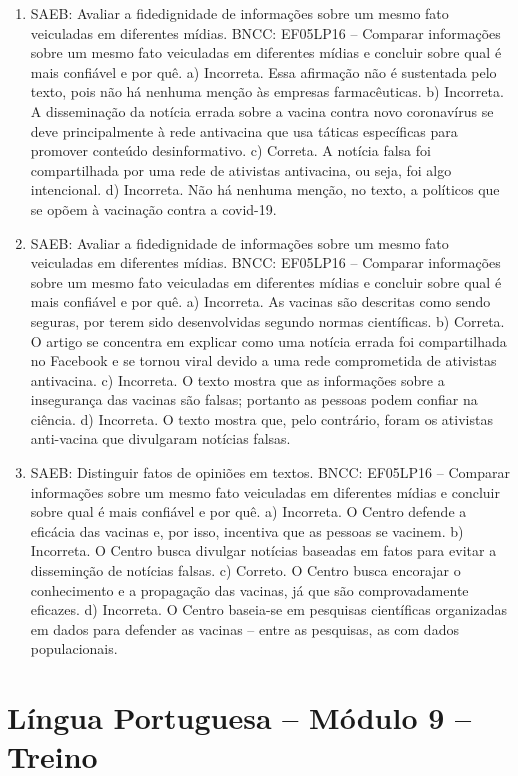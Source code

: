 \begin{enumerate}
\item
SAEB: Avaliar a fidedignidade de informações sobre um mesmo fato veiculadas em diferentes mídias. BNCC:
EF05LP16 – Comparar informações sobre um mesmo fato veiculadas em diferentes mídias e concluir sobre qual é mais confiável e por quê.
a) Incorreta. Essa afirmação não é sustentada pelo texto, pois não há
nenhuma menção às empresas farmacêuticas.
b) Incorreta. A disseminação da notícia errada sobre a vacina contra novo coronavírus se deve principalmente à rede antivacina que usa táticas
específicas para promover conteúdo desinformativo.
c) Correta. A notícia falsa foi compartilhada por uma rede de ativistas
antivacina, ou seja, foi algo intencional.
d) Incorreta. Não há nenhuma menção, no texto, a políticos que se opõem à vacinação
contra a covid-19.

\item
SAEB: Avaliar a fidedignidade de informações sobre um mesmo fato veiculadas em diferentes mídias. BNCC:
EF05LP16 – Comparar informações sobre um mesmo fato veiculadas em diferentes mídias e concluir sobre qual é mais confiável e por quê.
a) Incorreta. As vacinas são descritas como sendo seguras, por terem
sido desenvolvidas segundo normas científicas.
b) Correta. O artigo se concentra em explicar como uma notícia errada
foi compartilhada no Facebook e se tornou viral devido a uma rede
comprometida de ativistas antivacina.
c) Incorreta. O texto mostra que as informações sobre a insegurança das
vacinas são falsas; portanto as pessoas podem confiar na ciência.
d) Incorreta. O texto mostra que, pelo contrário, foram os ativistas
anti-vacina que divulgaram notícias falsas.

\item
SAEB: Distinguir fatos de opiniões em textos. BNCC: EF05LP16 – Comparar
informações sobre um mesmo fato veiculadas em diferentes mídias e concluir sobre
qual é mais confiável e por quê.
a) Incorreta. O Centro defende a eficácia das vacinas e, por isso, incentiva
que as pessoas se vacinem.
b) Incorreta. O Centro busca divulgar notícias baseadas em fatos para
evitar a disseminção de notícias falsas.
c) Correto. O Centro busca encorajar o conhecimento e a propagação das
vacinas, já que são comprovadamente eficazes.
d) Incorreta. O Centro baseia-se em pesquisas científicas organizadas em
dados para defender as vacinas – entre as pesquisas, as com dados populacionais.
\end{enumerate}

\section*{Língua Portuguesa – Módulo 9 – Treino}

